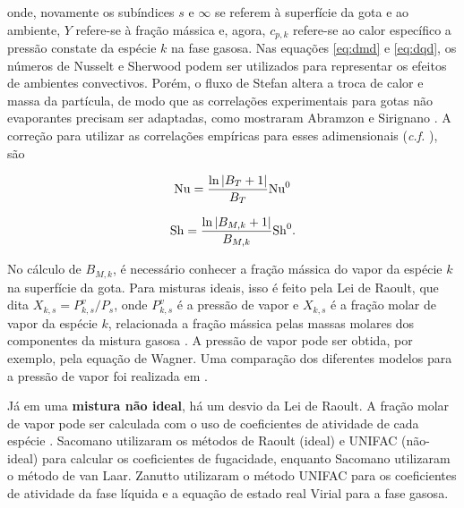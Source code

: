 onde, novamente os subíndices $s$ e $\infty$ se referem à superfície da gota e ao ambiente, $Y$ refere-se à fração mássica e, agora, $c_{p,k}$ refere-se ao calor específico a pressão constate da espécie $k$ na fase gasosa.
Nas equações \eqref{eq:dmd} e \eqref{eq:dqd}, os números de Nusselt e Sherwood podem ser utilizados para representar os efeitos de ambientes convectivos.
Porém, o fluxo de Stefan altera a troca de calor e massa da partícula, de modo que as correlações experimentais para gotas não evaporantes precisam ser adaptadas, como mostraram Abramzon e Sirignano \cite{Sirignano1989}.
A correção para utilizar as correlações empíricas para esses adimensionais  (\emph{c.f.} \cite[eqs. (8) e (9)]{SacomanoF2025CF}), são

\vspace{12pt}
\begin{minipage}{0.45\linewidth}
    \begin{equation}
        \mathrm{Nu} = \frac{\ln \left|B_T + 1\right|}{B_T} \mathrm{Nu}^0 
    \end{equation}
\end{minipage}
\begin{minipage}{0.5\linewidth}
    \begin{equation}
        \mathrm{Sh} = \frac{\ln \left|B_{M,k} + 1\right|}{B_{M,k}}\mathrm{Sh}^0 .
    \end{equation}
\end{minipage}
\vspace{12pt}

No cálculo de $B_{M,k}$, é necessário conhecer a fração mássica do vapor da espécie $k$ na superfície da gota.
Para misturas ideais, isso é feito pela Lei de Raoult, que dita $X_{k,s}=P^v_{k,s}/P_s$, onde $P^v_{k,s}$ é a pressão de vapor e $X_{k,s}$ é a fração molar de vapor da espécie $k$, relacionada a fração mássica pelas massas molares dos componentes da mistura gasosa \cite{Peters2010}.
A pressão de vapor pode ser obtida, por exemplo, pela equação de Wagner.
Uma comparação dos diferentes modelos para a pressão de vapor foi realizada em \cite{SacomanoF2019IJHMT}.

Já em uma \textbf{mistura não ideal}, há um desvio da Lei de Raoult. 
A fração molar de vapor pode ser calculada com o uso de coeficientes de atividade de cada espécie \cite{Bird2002}.
Sacomano\etal{} \cite{SacomanoF2022IJHMT} utilizaram os métodos de Raoult (ideal) e UNIFAC (não-ideal) para calcular os coeficientes de fugacidade, enquanto Sacomano\etal{} \cite{SacomanoF2025CF} utilizaram o método de van Laar.
Zanutto\etal{} \cite{ZanuttoC2019} utilizaram o método UNIFAC para os coeficientes de atividade da fase líquida e a equação de estado real Virial para a fase gasosa.



